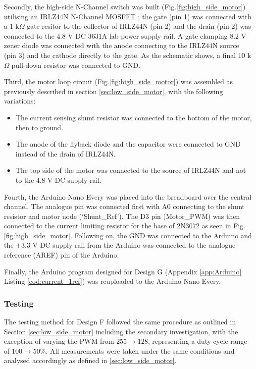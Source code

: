 Secondly, the high-side N-Channel switch was built (Fig.\ref{fig:high_side_motor}) utilising an IRLZ44N N-Channel MOSFET \cite{Infineon_IRLZ44N}; the gate (pin 1) was connected with a \(1\) k\(\Omega\) gate resitor to the collector of IRLZ44N (pin 2) and the drain (pin 2) was connected to the \(4.8\) V DC 3631A lab power supply rail. A gate clamping \(8.2\) V zener diode was connected with the anode connecting to the IRLZ44N source (pin 3) and the cathode directly to the gate. As the schematic shows, a final \(10\) k\(\Omega\) pull-down resistor was connected to GND.

Third, the motor loop circuit (Fig.\ref{fig:high_side_motor}) was assembled as previously described in section \ref{sec:low_side_motor}, with the following variations:
\begin{itemize}
    \item The current sensing shunt resistor was connected to the bottom of the motor, then to ground.
    \item The anode of the flyback diode and the capacitor were connected to GND instead of the drain of IRLZ44N.
    \item The top side of the motor was connected to the source of IRLZ44N and not to the \(4.8\) V DC supply rail.
\end{itemize}

Fourth, the Arduino Nano Every was placed into the breadboard over the central channel. The analogue pin was connected first with A0 connecting to the shunt resistor and motor node (`Shunt\_Ref'). The D3 pin (Motor\_PWM) was then connected to the current limiting resistor for the base of 2N3072 as seen in Fig.\ref{fig:high_side_motor}. Following on, the GND was connected to the Arduino and the \(+3.3\) V DC supply rail from the Arduino was connected to the analogue reference (AREF) pin of the Arduino.

Finally, the Arduino program designed for Design G (Appendix \ref{app:Arduino} Listing \ref{cod:current_1ref}) was reuploaded to the Arduino Nano Every.


\subsubsection{Testing}
The testing method for Design F followed the same procedure as outlined in Section \ref{sec:low_side_motor} including the secondary investigation, with the exception of varying the PWM from \(255\rightarrow128\), representing a duty cycle range of \(100\rightarrow50\%\). All measurements were taken under the same conditions and analysed accordingly as defined in \ref{sec:low_side_motor}.

